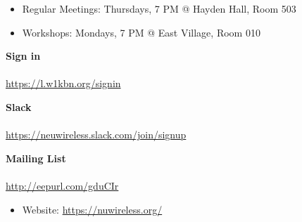 \documentclass{beamer}
\begin{document}
\begin{frame}
    \begin{tcolorbox}[colframe=blue!75!black, colback=blue!10, title=About, center title]
        \begin{itemize}
            \item Regular Meetings: Thursdays, 7 PM @ Hayden Hall, Room 503
            \item Workshops: Mondays, 7 PM @ East Village, Room 010
        \end{itemize}        
    \end{tcolorbox}
    
    \begin{tcolorbox}[colframe=blue!75!black, colback=blue!10, title=QR Codes \& Links, center title]
        \begin{minipage}{0.32\textwidth}
            \centering
            \textbf{Sign in} \\
             \\
            \tiny \url{https://l.w1kbn.org/signin}  %
        \end{minipage}
        \begin{minipage}{0.32\textwidth}
            \centering
            \textbf{Slack} \\
             \\
            \tiny \url{https://neuwireless.slack.com/join/signup}
        \end{minipage}
        \begin{minipage}{0.32\textwidth}
            \centering
            \textbf{Mailing List} \\
             \\
            \tiny \url{http://eepurl.com/gduCIr}
        \end{minipage}
        \begin{itemize}
            \item Website: \url{https://nuwireless.org/}
        \end{itemize}
    \end{tcolorbox}
\end{frame}
\end{document}
